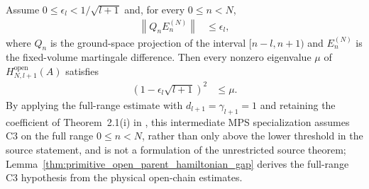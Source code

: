 \begin{lemma}
    \label{thm:open_parent_hamiltonian_fixed_c3_gap}
    \leanok
    Assume $0\leq\epsilon_l<1/\sqrt{l+1}$ and, for every
    $0\leq n<N$,
    \begin{align}
        \left\lVert Q_nE_n^{(N)}\right\rVert & \leq\epsilon_l,
        \label{eq:open_parent_hamiltonian_fixed_c3}
    \end{align}
    where $Q_n$ is the ground-space projection of the interval
    $[n-l,n+1)$ and $E_n^{(N)}$ is the fixed-volume martingale difference.
    Then every nonzero eigenvalue $\mu$ of $H^{\mathrm{open}}_{N,l+1}(A)$
    satisfies
    \begin{align}
        \left(1-\epsilon_l\sqrt{l+1}\right)^2
         & \leq\mu.
        \label{eq:open_parent_hamiltonian_fixed_c3_gap}
    \end{align}
    By applying the full-range estimate with $d_{l+1}=\gamma_{l+1}=1$ and
    retaining the coefficient of Theorem~2.1(i) in
    \cite{Nachtergaele1996Spectral}, this intermediate MPS specialization
    assumes C3 on the full range $0\leq n<N$, rather than only above the lower
    threshold in the source statement, and is not a formulation of the
    unrestricted source theorem;
    Lemma~\ref{thm:primitive_open_parent_hamiltonian_gap} derives the
    full-range C3 hypothesis from the physical open-chain estimates.
\end{lemma}

